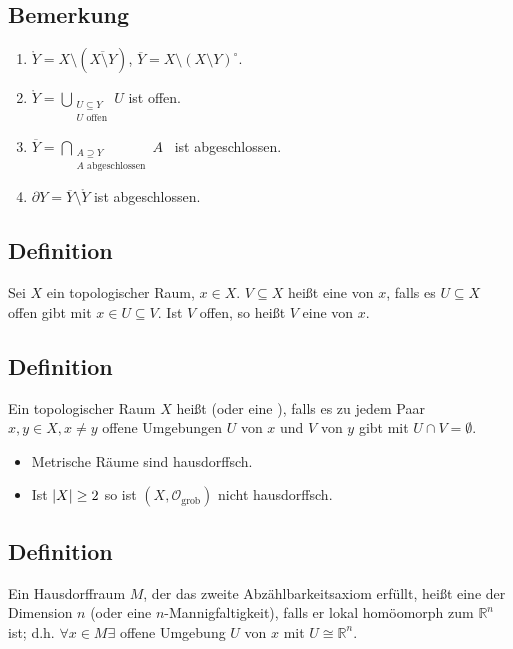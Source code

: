 \subsection[Bemerkung: Gleichungen für Inneres, Abschluss und Rand]{Bemerkung} %
\label{sub:120}
\begin{enumerate}[1)]
	\item $\mathring Y = X \setminus (\overline{X \setminus Y} )$, $\overline{Y} = X \setminus (X \setminus Y)^\circ$.
	\item $\mathring Y = \bigcup_{\substack{U \subseteq Y \\ U \text{ offen}}} U$ ist offen.
	\item $\overline{Y} = \bigcap\limits_{\substack{A \supseteq Y \\ A \text{ abgeschlossen}}} \! \! \! \! A \enspace$ ist abgeschlossen.
	\item $\partial Y = \overline{Y} \setminus \mathring Y $ ist abgeschlossen.
\end{enumerate}

\subsection[Definition: Umgebung]{Definition} %
\label{sub:121}
Sei $X$ ein topologischer Raum, $x \in X$. $V \subseteq X$ heißt eine  von $x$, falls es $U \subseteq X$ offen gibt mit $x \in U \subseteq V$. Ist $V$
offen, so heißt $V$ eine  von $x$. 

\subsection[Definition: Hausdorffraum]{Definition} %
\label{sub:122}
Ein topologischer Raum $X$ heißt  (oder eine ), falls es zu jedem Paar $x,y \in X, x \not= y$ offene Umgebungen $U$ von $x$ und
$V$ von $y$ gibt mit $U \cap V = \emptyset$.
\begin{itemize}
	\item Metrische Räume sind hausdorffsch.
	\item Ist $\abs*{X} \ge 2 $ so ist $(X, \mathcal{O}_{\text{grob}} )$ nicht hausdorffsch.
\end{itemize}

\subsection[Definition: topologische Mannigfaltigkeit]{Definition} %
\label{sub:123}
Ein Hausdorffraum $M$, der das zweite Abzählbarkeitsaxiom erfüllt, heißt eine  der Dimension $n$ (oder eine $n$-Mannigfaltigkeit), 
falls er lokal homöomorph zum $\mathds{R}^n$ ist; d.h. $\forall x \in M \exists$ offene Umgebung $U$ von $x$ mit $U \cong \mathds{R}^n$.
\newpage


